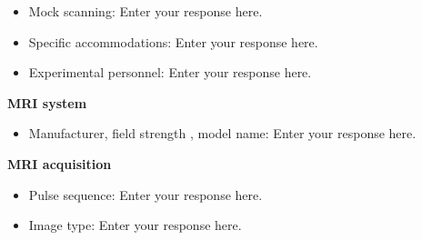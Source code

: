 \documentclass[]{article}
\providecommand{\tightlist}{%
\setlength{\itemsep}{0pt}\setlength{\parskip}{0pt}}
\begin{document}
\begin{itemize}
\item
  Mock scanning: Enter your response here.
\item
  Specific accommodations: Enter your response here.
\item
  Experimental personnel: Enter your response here.
\end{itemize}

\textbf{MRI system}

\begin{itemize}
\tightlist
\item
  Manufacturer, field strength , model name: Enter your response here.
\end{itemize}

\textbf{MRI acquisition}

\begin{itemize}
\item
  Pulse sequence: Enter your response here.
\item
  Image type: Enter your response here.
\end{itemize}
\end{document}
